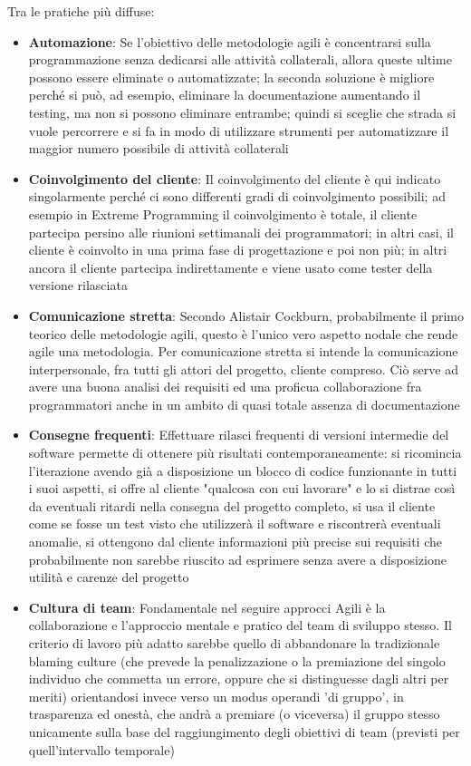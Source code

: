 \documentclass[11pt,a4paper]{book}
\begin{document}
Tra le pratiche più diffuse:
\begin{itemize}
	\item \textbf{Automazione}: Se l'obiettivo delle metodologie agili è concentrarsi sulla programmazione senza dedicarsi alle attività collaterali, allora queste ultime possono essere eliminate o automatizzate; la seconda soluzione è migliore perché si può, ad esempio, eliminare la documentazione aumentando il testing, ma non si possono eliminare entrambe; quindi si sceglie che strada si vuole percorrere e si fa in modo di utilizzare strumenti per automatizzare il maggior numero possibile di attività collaterali
	\item \textbf{Coinvolgimento del cliente}: Il coinvolgimento del cliente è qui indicato singolarmente perché ci sono differenti gradi di coinvolgimento possibili; ad esempio in Extreme Programming il coinvolgimento è totale, il cliente partecipa persino alle riunioni settimanali dei programmatori; in altri casi, il cliente è coinvolto in una prima fase di progettazione e poi non più; in altri ancora il cliente partecipa indirettamente e viene usato come tester della versione rilasciata
	\item \textbf{Comunicazione stretta}: Secondo Alistair Cockburn, probabilmente il primo teorico delle metodologie agili, questo è l'unico vero aspetto nodale che rende agile una metodologia. Per comunicazione stretta si intende la comunicazione interpersonale, fra tutti gli attori del progetto, cliente compreso. Ciò serve ad avere una buona analisi dei requisiti ed una proficua collaborazione fra programmatori anche in un ambito di quasi totale assenza di documentazione
	\item \textbf{Consegne frequenti}: Effettuare rilasci frequenti di versioni intermedie del software permette di ottenere più risultati contemporaneamente: si ricomincia l'iterazione avendo già a disposizione un blocco di codice funzionante in tutti i suoi aspetti, si offre al cliente "qualcosa con cui lavorare" e lo si distrae così da eventuali ritardi nella consegna del progetto completo, si usa il cliente come se fosse un test visto che utilizzerà il software e riscontrerà eventuali anomalie, si ottengono dal cliente informazioni più precise sui requisiti che probabilmente non sarebbe riuscito ad esprimere senza avere a disposizione utilità e carenze del progetto
	\item \textbf{Cultura di team}: Fondamentale nel seguire approcci Agili è la collaborazione e l'approccio mentale e pratico del team di sviluppo stesso. Il criterio di lavoro più adatto sarebbe quello di abbandonare la tradizionale blaming culture (che prevede la penalizzazione o la premiazione del singolo individuo che commetta un errore, oppure che si distinguesse dagli altri per meriti) orientandosi invece verso un modus operandi 'di gruppo', in trasparenza ed onestà, che andrà a premiare (o viceversa) il gruppo stesso unicamente sulla base del raggiungimento degli obiettivi di team (previsti per quell'intervallo temporale)

\end{itemize}
\end{document}
